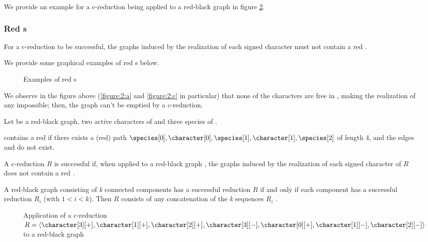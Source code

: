 We provide an example for a c-reduction being applied to a red-black graph in figure \ref{figure:3}.

\subsubsection*{Red \boldmath{\sg{}}s}

For a c-reduction to be successful, the graphs \grb[i] induced by the realization of each signed character \character[i][\pm] must not contain a red \sg{}.

We provide some graphical examples of red \sg{}s below.

\begin{figure}[H]
  

  \caption{Examples of red \sg{}s}\label{figure:2}
\end{figure}

We observe in the figure above (\ref{figure:2:a} and \ref{figure:2:c} in particular) that none of the characters are free in \grb{}, making the realization of any \character[i][-] impossible; then, the graph can't be emptied by a c-reduction.

\begin{definition}[Red \sg{}]\label{definition:sigma-graph}
  Let \grb{} be a red-black graph, \character[0] \character[1] two active characters of \grb{} and \species[0] \species[1] \species[2] three species of \grb{}.

  \grb{} contains a red \sg{} if there exists a (red) path $\species[0], \character[0], \species[1], \character[1], \species[2]$ of length 4, and the edges \edge{\character[0]}{\species[2]} and \edge{\character[1]}{\species[0]} do not exist.
\end{definition}

A c-reduction $R$ is successful if, when applied to a red-black graph \grb{}, the graphs \grb[i] induced by the realization of each signed character \character[i][\pm] of $R$ does not contain a red \sg{}.

A red-black graph consisting of \textit{k} connected components has a successful reduction $R$ if and only if each component has a successful reduction $R_{i}$ (with $1 < i < k$).
Then $R$ consists of any concatenation of the \textit{k} sequences $R_{i}$ \cite{PPPptime2016}.

\begin{figure}[hp]
  

  \caption{Application of a c-reduction $R = \langle \character[3][+], \character[1][+], \character[2][+], \character[3][-], \character[0][+], \character[1][-], \character[2][-] \rangle$ to a red-black graph \grb{}}\label{figure:3}
\end{figure}
